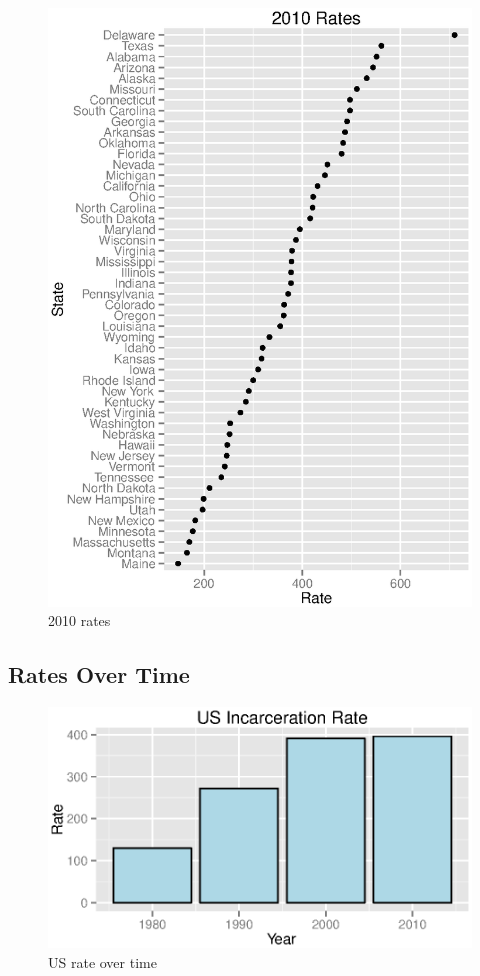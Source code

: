 \documentclass{exam}
\begin{document}
  \begin{figure}[H]
    \centering
    \includegraphics[scale = 0.9]{figures/state_rates_2010.eps}
    \caption{2010 rates}
  \end{figure}

  \subsection{Rates Over Time}
  \begin{figure}[H]
    \centering
    \includegraphics[scale = 0.9]{figures/us_rate_over_time.eps}
    \caption{US rate over time}
  \end{figure}
\end{document}
